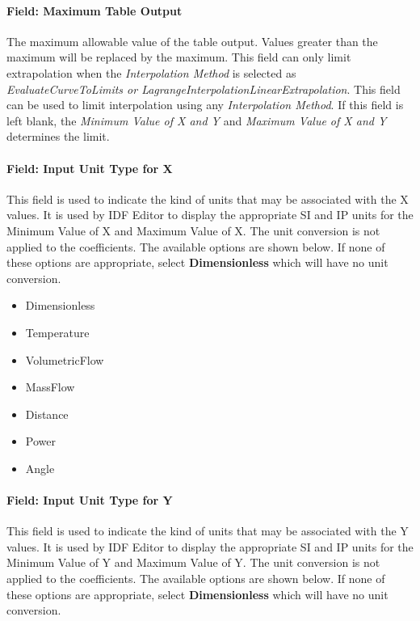 \paragraph{Field: Maximum Table Output}\label{field-maximum-table-output-1}

The maximum allowable value of the table output. Values greater than the maximum will be replaced by the maximum. This field can only limit extrapolation when the \emph{Interpolation Method} is selected as \emph{EvaluateCurveToLimits or LagrangeInterpolationLinearExtrapolation}. This field can be used to limit interpolation using any \emph{Interpolation Method}. If this field is left blank, the \emph{Minimum Value of X and Y} and \emph{Maximum Value of X and Y} determines the limit.

\paragraph{Field: Input Unit Type for X}\label{field-input-unit-type-for-x-000}

This field is used to indicate the kind of units that may be associated with the X values. It is used by IDF Editor to display the appropriate SI and IP units for the Minimum Value of X and Maximum Value of X. The unit conversion is not applied to the coefficients. The available options are shown below. If none of these options are appropriate, select \textbf{Dimensionless} which will have no unit conversion.

\begin{itemize}
\item
  Dimensionless
\item
  Temperature
\item
  VolumetricFlow
\item
  MassFlow
\item
  Distance
\item
  Power
\item
  Angle
\end{itemize}

\paragraph{Field: Input Unit Type for Y}\label{field-input-unit-type-for-y-000}

This field is used to indicate the kind of units that may be associated with the Y values. It is used by IDF Editor to display the appropriate SI and IP units for the Minimum Value of Y and Maximum Value of Y. The unit conversion is not applied to the coefficients. The available options are shown below. If none of these options are appropriate, select \textbf{Dimensionless} which will have no unit conversion.

